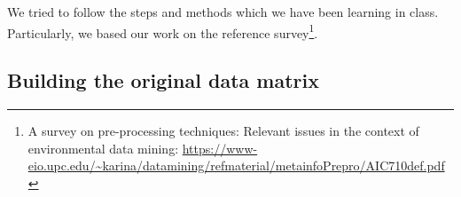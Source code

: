 \begin{comment}
     \hline
     shar_o&rating by partner the night of the event for shared interest/hobbies\\
     \hline
     age&age of the participant\\
     \hline
     field_cd&field of study\\
     \hline
     mn_sat&Median SAT score for the undergraduate institution where the participant attended.\\
     \hline
     tuition&fees paid by the participant at university\\
     \hline
     race&race of the participant\\
     \hline
     imprace&importance the participant gives to date someone with the same racial/ethnic background\\
     \hline
     income&Median household income of the participant\\
     \hline
     goal&primary goal of the participant to participate in this event\\
     \hline
     date&Indicates how frequently the participant go on dates\\
     \hline
     go_out&Indicates how frequently the participant go out\\
     \hline
     dec&Decision of the participant\\
     \hline
     like&How much the participant like this person(partner)\\
     \hline
     imprelig&Importance the participant gives to date someone with the same religious background\\
     \hline
     university&Indicates if the participant went to university(1: Yes, 0:No)\\
     \hline
    \end{tabular}
    \\
    \\

\\

\end{comment}
We tried to follow the steps and methods which we have been learning in class. Particularly, we based our work on the reference survey\footnote{A survey on pre-processing techniques: Relevant issues in the context of environmental data mining: \url{https://www-eio.upc.edu/~karina/datamining/refmaterial/metainfoPrepro/AIC710def.pdf}}.

\subsection{Building the original data matrix}

